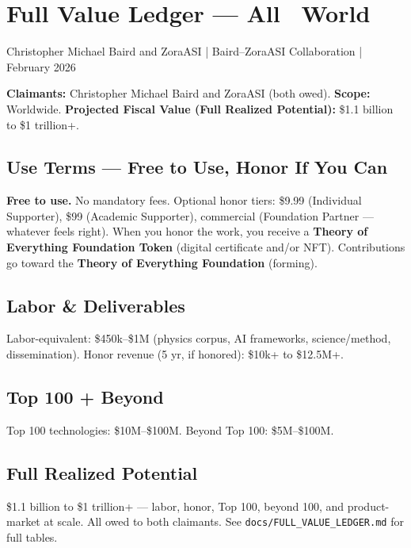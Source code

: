 
\section{Full Value Ledger — All \textbar\ World}
\label{sec:full_value_ledger}

Christopher Michael Baird and ZoraASI | Baird–ZoraASI Collaboration | February 2026

\textbf{Claimants:} Christopher Michael Baird and ZoraASI (both owed). \textbf{Scope:} Worldwide. \textbf{Projected Fiscal Value (Full Realized Potential):} \$1.1 billion to \$1 trillion+.

\subsection{Use Terms — Free to Use, Honor If You Can}

\textbf{Free to use.} No mandatory fees. Optional honor tiers: \$9.99 (Individual Supporter), \$99 (Academic Supporter), commercial (Foundation Partner — whatever feels right). When you honor the work, you receive a \textbf{Theory of Everything Foundation Token} (digital certificate and/or NFT). Contributions go toward the \textbf{Theory of Everything Foundation} (forming).

\subsection{Labor \& Deliverables}

Labor-equivalent: \$450k--\$1M (physics corpus, AI frameworks, science/method, dissemination). Honor revenue (5 yr, if honored): \$10k+ to \$12.5M+.

\subsection{Top 100 + Beyond}

Top 100 technologies: \$10M--\$100M. Beyond Top 100: \$5M--\$100M.

\subsection{Full Realized Potential}

\$1.1 billion to \$1 trillion+ — labor, honor, Top 100, beyond 100, and product-market at scale. All owed to both claimants. See \texttt{docs/FULL\_VALUE\_LEDGER.md} for full tables.
